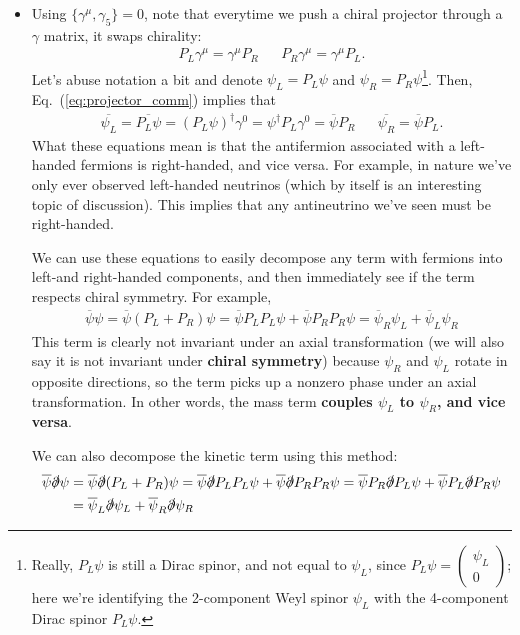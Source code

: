 \documentclass[12pt, oneside]{article}   	%
\theoremstyle{definition}
\begin{document}
\begin{itemize}
	\item Using $\{\gamma^\mu, \gamma_5\} = 0$, note that everytime we push a chiral projector through a $\gamma$ matrix, it swaps chirality:
	\begin{align}
		P_L\gamma^\mu = \gamma^\mu P_R && P_R \gamma^\mu = \gamma^\mu P_L. \label{eq:projector_comm}
	\end{align}
	Let's abuse notation a bit and denote $\psi_L = P_L \psi$ and $\psi_R = P_R \psi$\footnote{Really, $P_L\psi$ is still a Dirac spinor, and not equal to $\psi_L$, since $P_L\psi = \begin{pmatrix} \psi_L \\ 0 \end{pmatrix}$; here we're identifying the 2-component Weyl spinor $\psi_L$ with the 4-component Dirac spinor $P_L \psi$. }. Then, Eq.~(\ref{eq:projector_comm}) implies that
	\begin{align}
		\overline{\psi_L} = \overline{P_L\psi} = (P_L\psi)^\dagger \gamma^0 = \psi^\dagger P_L \gamma^0 = \overline{\psi} P_R && \overline{\psi_R} = \overline\psi P_L.
	\end{align}
	What these equations mean is that the antifermion associated with a left-handed fermions is right-handed, and vice versa. For example, in nature we've only ever observed left-handed neutrinos (which by itself is an interesting topic of discussion). This implies that any antineutrino we've seen must be right-handed. 

	We can use these equations to easily decompose any term with fermions into left-and right-handed components, and then immediately see if the term respects chiral symmetry. For example, 
	\begin{align}
		\overline\psi \psi = \overline\psi (P_L + P_R) \psi = \overline\psi P_L P_L \psi + \overline\psi P_R P_R \psi = \overline\psi_R \psi_L + \overline\psi_L \psi_R \label{eq:mass_term_chiral}
	\end{align}
	This term is clearly not invariant under an axial transformation (we will also say it is not invariant under \textbf{chiral symmetry}) because $\psi_R$ and $\psi_L$ rotate in opposite directions, so the term picks up a nonzero phase under an axial transformation. In other words, the mass term \textbf{couples $\psi_L$ to $\psi_R$, and vice versa}. 
	
	We can also decompose the kinetic term using this method:
	\begin{align}\begin{split}
		\overline\psi\slashed\partial\psi &= \overline\psi\slashed\partial (P_L + P_R) \psi = \overline\psi\slashed\partial P_L P_L \psi + \overline\psi\slashed\partial P_R P_R \psi = \overline\psi P_R \slashed\partial P_L \psi + \overline\psi P_L \slashed\partial P_R \psi \\
		&= \overline\psi_L \slashed\partial \psi_L + \overline\psi_R \slashed\partial \psi_R
	\end{split}\end{align}
	

\end{itemize}
\end{document}
